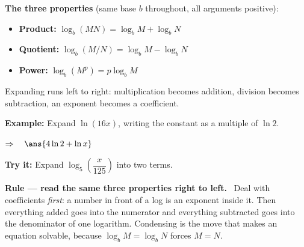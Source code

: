 \documentclass[12pt]{article}
\begin{document}


\begin{formulabox}
\textbf{The three properties} (same base $b$ throughout, all arguments positive):
\begin{itemize}[leftmargin=0.8cm, itemsep=0pt, topsep=2pt]
  \item \textbf{Product:} $\log_b(MN) = \log_b M + \log_b N$
  \item \textbf{Quotient:} $\log_b(M/N) = \log_b M - \log_b N$
  \item \textbf{Power:} $\log_b(M^p) = p\log_b M$
\end{itemize}
Expanding runs left to right: multiplication becomes addition, division becomes subtraction, an exponent becomes a coefficient.
\end{formulabox}

\begin{examplebox}
\textbf{Example:} \quad Expand $\ln(16x)$, writing the constant as a multiple of $\ln 2$.


$\Rightarrow\quad \ans{4\ln 2 + \ln x}$
\end{examplebox}

\begin{tryitbox}
\textbf{Try it:} \quad Expand $\log_5\!\left(\dfrac{x}{125}\right)$ into two terms.\\[2pt]
\end{tryitbox}


\begin{formulabox}
\textbf{Rule --- read the same three properties right to left.} \ Deal with coefficients \emph{first}: a number in front of a log is an exponent inside it. Then everything added goes into the numerator and everything subtracted goes into the denominator of one logarithm. Condensing is the move that makes an equation solvable, because $\log_b M = \log_b N$ forces $M = N$.
\end{formulabox}
\end{document}
